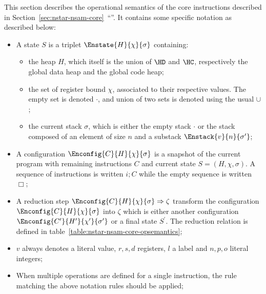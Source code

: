 This section describes the operational semantics of the core instructions described in Section~\ref{sec:nstar-nsam-core}~``''.
It contains some specific notation as described below:
\begin{itemize}
	\item A state $S$ is a triplet $\Enstate{H}{\chi}{\sigma}$ containing:
	      \begin{itemize}
		      \item the heap $H$, which itself is the union of $\HD$ and $\HC$, respectively the global data heap and the global code heap;
		      \item the set of register bound $\chi$, associated to their respective values. The empty set is denoted $\cdot$, and union of two sets is denoted using the usual $\cup$;
		      \item the current stack $\sigma$, which is either the empty stack $\cdot$ or the stack composed of an element of size $n$ and a substack $\Enstack{v}{n}{\sigma^\prime}$;
	      \end{itemize}
	\item A configuration $\Enconfig{C}{H}{\chi}{\sigma}$ is a snapshot of the current program with remaining instructions $C$ and current state $S = (H, \chi, \sigma)$.
	      A sequence of instructions is written $i; C$ while the empty sequence is written $\Box$;
	\item A reduction step ${\Enconfig{C}{H}{\chi}{\sigma}}\Rightarrow{\zeta}$ transform the configuration $\Enconfig{C}{H}{\chi}{\sigma}$ into $\zeta$ which is either another configuration $\Enconfig{C^\prime}{H^\prime}{\chi^\prime}{\sigma^\prime}$ or a final state $S^\prime$. The reduction relation is defined in table~\ref{table:nstar-nsam-core-opsemantics};
	\item $v$ always denotes a literal value, $r, s, d$ registers, $l$ a label and $n, p, o$ literal integers;
	\item When multiple operations are defined for a single instruction, the rule matching the above notation rules should be applied;
\end{itemize}

\begingroup
\renewcommand\cellset{\renewcommand\arraystretch{0.8}\setlength\extrarowheight{0pt}}

